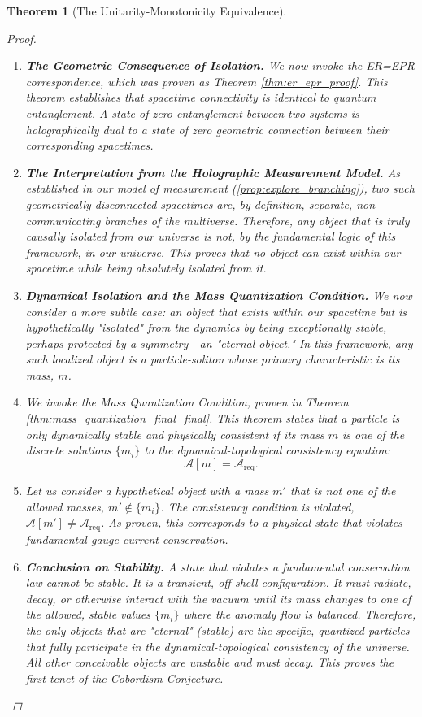 \documentclass[11pt, letterpaper]{report}
\theoremstyle{plain} %
\newtheorem{theorem}{Theorem}[chapter]
\theoremstyle{definition} %
\theoremstyle{remark} %
\begin{document}
\begin{theorem}[The Unitarity-Monotonicity Equivalence]
\begin{proof}
\begin{enumerate}
    \item \textbf{The Geometric Consequence of Isolation.} We now invoke the ER=EPR correspondence, which was proven as Theorem \ref{thm:er_epr_proof}. This theorem establishes that spacetime connectivity is identical to quantum entanglement. A state of zero entanglement between two systems is holographically dual to a state of zero geometric connection between their corresponding spacetimes.

    \item \textbf{The Interpretation from the Holographic Measurement Model.} As established in our model of measurement (\cref{prop:explore_branching}), two such geometrically disconnected spacetimes are, by definition, separate, non-communicating branches of the multiverse. Therefore, any object that is truly causally isolated from our universe is not, by the fundamental logic of this framework, \textit{in} our universe. This proves that no object can exist within our spacetime while being absolutely isolated from it.

    \item \textbf{Dynamical Isolation and the Mass Quantization Condition.} We now consider a more subtle case: an object that exists within our spacetime but is hypothetically "isolated" from the dynamics by being exceptionally stable, perhaps protected by a symmetry—an "eternal object." In this framework, any such localized object is a particle-soliton whose primary characteristic is its mass, $m$.

    \item We invoke the Mass Quantization Condition, proven in Theorem \ref{thm:mass_quantization_final_final}. This theorem states that a particle is only dynamically stable and physically consistent if its mass $m$ is one of the discrete solutions $\{m_i\}$ to the dynamical-topological consistency equation:
    \begin{equation}
        \mathcal{A}[m] = \mathcal{A}_{\text{req}}.
    \end{equation}

    \item Let us consider a hypothetical object with a mass $m'$ that is not one of the allowed masses, $m' \notin \{m_i\}$. The consistency condition is violated, $\mathcal{A}[m'] \neq \mathcal{A}_{\text{req}}$. As proven, this corresponds to a physical state that violates fundamental gauge current conservation.

    \item \textbf{Conclusion on Stability.} A state that violates a fundamental conservation law cannot be stable. It is a transient, off-shell configuration. It must radiate, decay, or otherwise interact with the vacuum until its mass changes to one of the allowed, stable values $\{m_i\}$ where the anomaly flow is balanced. Therefore, the only objects that are "eternal" (stable) are the specific, quantized particles that fully participate in the dynamical-topological consistency of the universe. All other conceivable objects are unstable and must decay. This proves the first tenet of the Cobordism Conjecture.
\end{enumerate}


\end{proof}
\end{theorem}
\end{document}
